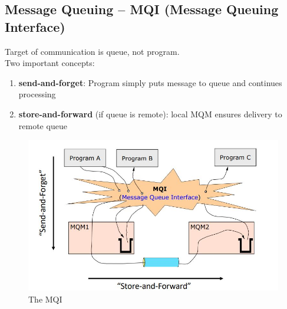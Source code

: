 		 
		\subsection{Message Queuing -- MQI (Message Queuing Interface)}
			Target of communication is queue, not program.\\
			Two important concepts:
			\begin{enumerate}
				\item \textbf{send-and-forget}: Program simply puts message to queue and continues processing
				\item \textbf{store-and-forward} (if queue is remote): local MQM ensures delivery to remote queue

			\end{enumerate}
			\begin{figure}[h!]
				\includegraphics[scale=0.5]{res/mqi.jpg}
				\caption{The MQI}
			\end{figure}
		
		\pagebreak %
		
